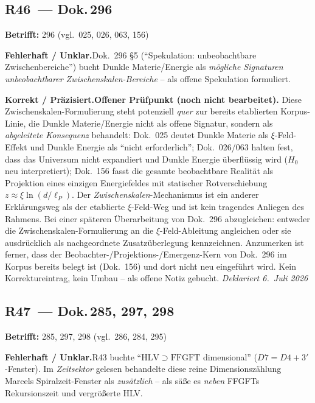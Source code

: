 \medskip


\subsection*{R46~--- Dok.\,296}

\noindent\textbf{Betrifft:} 296 (vgl.\ 025, 026, 063, 156)


\smallskip\noindent\textbf{Fehlerhaft / Unklar.}\quad Dok.~296 §5 (\enquote{Spekulation: unbeobachtbare Zwischenbereiche}) bucht Dunkle Materie/Energie als \emph{mögliche Signaturen unbeobachtbarer Zwischenskalen-Bereiche} -- als offene Spekulation formuliert.


\smallskip\noindent\textbf{Korrekt / Präzisiert.}\quad \textbf{Offener Prüfpunkt (noch nicht bearbeitet).} Diese Zwischenskalen-Formulierung steht potenziell \emph{quer} zur bereits etablierten Korpus-Linie, die Dunkle Materie/Energie nicht als offene Signatur, sondern als \emph{abgeleitete Konsequenz} behandelt: Dok.~025 deutet Dunkle Materie als $\xi$-Feld-Effekt und Dunkle Energie als \enquote{nicht erforderlich}; Dok.~026/063 halten fest, dass das Universum nicht expandiert und Dunkle Energie überflüssig wird ($H_0$ neu interpretiert); Dok.~156 fasst die gesamte beobachtbare Realität als Projektion eines einzigen Energiefeldes mit statischer Rotverschiebung $z \approx \xi\ln(d/\ell_P)$. Der \emph{Zwischenskalen}-Mechanismus ist ein anderer Erklärungsweg als der etablierte $\xi$-Feld-Weg und ist kein tragendes Anliegen des Rahmens. Bei einer späteren Überarbeitung von Dok.~296 abzugleichen: entweder die Zwischenskalen-Formulierung an die $\xi$-Feld-Ableitung angleichen oder sie ausdrücklich als nachgeordnete Zusatzüberlegung kennzeichnen. Anzumerken ist ferner, dass der Beobachter-/Projektions-/Emergenz-Kern von Dok.~296 im Korpus bereits belegt ist (Dok.~156) und dort nicht neu eingeführt wird. Kein Korrektureintrag, kein Umbau -- als offene Notiz gebucht. \emph{Deklariert 6.~Juli 2026}


\medskip


\subsection*{R47~--- Dok.\,285, 297, 298}

\noindent\textbf{Betrifft:} 285, 297, 298 (vgl.\ 286, 284, 295)


\smallskip\noindent\textbf{Fehlerhaft / Unklar.}\quad R43 buchte \enquote{$\mathrm{HLV}\supset\mathrm{FFGFT}$ dimensional} ($D7=D4+3'$-Fenster). Im \emph{Zeitsektor} gelesen behandelte diese reine Dimensionszählung Marcels Spiralzeit-Fenster als \emph{zusätzlich} -- als säße es \emph{neben} FFGFTs Rekursionszeit und vergrößerte HLV.


